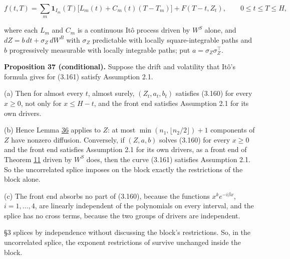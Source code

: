 \documentclass[11pt]{article}
\begin{document}
\begin{equation*}
f(t,T)=\sum_m\mathbf 1_{I_m}(T)\bigl[L_m(t)+C_m(t)(T-T_m)\bigr]+F(T-t,Z_t),\qquad 0\le t\le T\le H, \tag{3.161}\label{eq:3.161}
\end{equation*}

where each \(L_m\) and \(C_m\) is a continuous Itô process driven by \(W^S\) alone, and \(dZ=b\,dt+\sigma_Z\,dW^B\) with \(\sigma_Z\) predictable with locally square-integrable paths and \(b\) progressively measurable with locally integrable paths; put \(a=\sigma_Z\sigma_Z^\top\).

\label{res:Proposition-37}
\textbf{Proposition 37 (conditional).} Suppose the drift and volatility that Itô's formula gives for (3.161) satisfy Assumption 2.1.

(a) Then for almost every \(t\), almost surely, \((Z_t,a_t,b_t)\) satisfies (3.160) for every \(x\ge0\), not only for \(x\le H-t\), and the front end satisfies Assumption 2.1 for its own drivers.

(b) Hence Lemma \hyperref[res:Lemma-36]{36} applies to \(Z\): at most \(\min(n_1,\lfloor n_2/2\rfloor)+1\) components of \(Z\) have nonzero diffusion. Conversely, if \((Z,a,b)\) solves (3.160) for every \(x\ge0\) and the front end satisfies Assumption 2.1 for its own drivers, as a front end of Theorem \hyperref[res:Theorem-11]{11} driven by \(W^S\) does, then the curve (3.161) satisfies Assumption 2.1. So the uncorrelated splice imposes on the block exactly the restrictions of the block alone.

(c) The front end absorbs no part of (3.160), because the functions \(x^ke^{-i\beta x}\), \(i=1,\dots,4\), are linearly independent of the polynomials on every interval, and the splice has no cross terms, because the two groups of drivers are independent.

\cite{gellert2021short} §3 splices by independence without discussing the block's restrictions. So, in the uncorrelated splice, the exponent restrictions of \cite{sharef2004conditions} survive unchanged inside the block.
\end{document}

